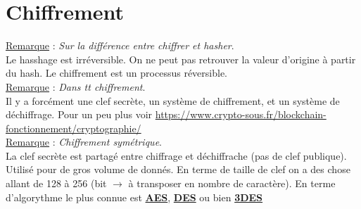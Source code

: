 \documentclass[a4paper,12pt,twoside]{article}
\newcommand{\urlcolor}{magenta}  %
\newcommand{\keycolor}{purple} %
\newcommand{\rem}[2]{\noindent\underline{Remarque} : \textit{#1}.\\ \indent #2}
\newcommand{\keyref}[2]{\hypersetup{urlcolor=\keycolor} \href{#1}{\textbf{#2}}\hypersetup{urlcolor=\urlcolor}}
\begin{document}
\section{Chiffrement}

\rem{Sur la différence entre chiffrer et hasher}{Le hasshage est irréversible. On ne peut pas retrouver la valeur d'origine à partir du hash. Le chiffrement est un processus réversible.}\\

\rem{Dans tt chiffrement}{Il y a forcément une clef secrète, un système de chiffrement, et un système de déchiffrage. Pour un peu plus voir \url{https://www.crypto-sous.fr/blockchain-fonctionnement/cryptographie/}}\\

\rem{Chiffrement symétrique}{La clef secrète est partagé entre chiffrage et déchiffrache (pas de clef publique). Utilisé pour de gros volume de donnés. En terme de taille de clef on a des chose allant de 128 à 256 (bit $\to$ à transposer en nombre de caractère). En terme d'algorythme le plus connue est \keyref{https://fr.wikipedia.org/wiki/Advanced\_Encryption\_Standard}{AES}, \keyref{https://fr.wikipedia.org/wiki/Data\_Encryption\_Standard}{DES} ou bien \keyref{https://fr.wikipedia.org/wiki/Triple_DES}{3DES}}\\
\end{document}

